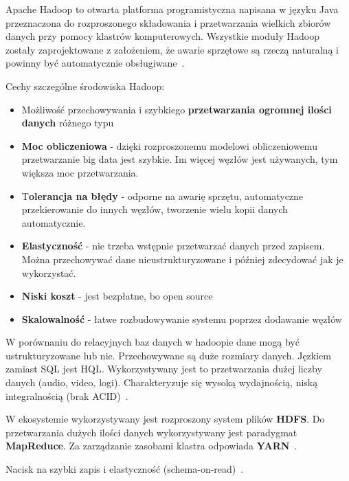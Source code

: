\documentclass[wi]{zut}
\begin{document}
Apache Hadoop to otwarta platforma programistyczna napisana w języku Java przeznaczona do rozproszonego składowania i przetwarzania wielkich zbiorów danych przy pomocy klastrów komputerowych. Wszystkie moduły Hadoop zostały zaprojektowane z założeniem, że awarie sprzętowe są rzeczą naturalną i powinny być automatycznie obsługiwane~\cite{Korytkowski_hadoop}.

Cechy szczególne środowiska Hadoop:

\begin{itemize}
    \item Możliwość przechowywania i szybkiego \textbf{przetwarzania ogromnej ilości danych} różnego typu
    \item \textbf{Moc obliczeniowa} - dzięki rozproszonemu modelowi obliczeniowemu przetwarzanie big data jest szybkie. Im więcej węzłów jest używanych, tym większa moc przetwarzania.
    \item T\textbf{olerancja na błędy} - odporne na awarię sprzętu, automatyczne przekierowanie do innych węzłów, tworzenie wielu kopii danych automatycznie.
    \item \textbf{Elastyczność} - nie trzeba wstępnie przetwarzać danych przed zapisem. Można przechowywać dane nieustrukturyzowane i później zdecydować jak je wykorzystać.
    \item \textbf{Niski koszt} - jest bezpłatne, bo open source
    \item \textbf{Skalowalność} - łatwe rozbudowywanie systemu poprzez dodawanie węzłów
\end{itemize}

W porównaniu do relacyjnych baz danych w hadoopie dane mogą być ustrukturyzowane lub nie. Przechowywane są duże rozmiary danych. Jęzkiem zamiast SQL jest HQL. Wykorzystywany jest to przetwarzania dużej liczby danych (audio, video, logi). Charakteryzuje się wysoką wydajnością, niską integralnością (brak ACID)~\cite{Korytkowski_hadoop}.

W ekosystemie wykorzystywany jest rozproszony system plików \textbf{HDFS}. Do przetwarzania dużych ilości danych wykorzystywany jest paradygmat \textbf{MapReduce}. Za zarządzanie zasobami klastra odpowiada \textbf{YARN}~\cite{Korytkowski_hadoop}.

Nacisk na szybki zapis i elastyczność (schema-on-read)~\cite{Korytkowski_hadoop}.
\end{document}
